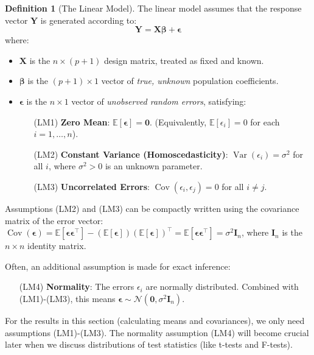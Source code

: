 \documentclass[11pt, letterpaper]{article}
\theoremstyle{definition}
\newtheorem{definition}{Definition}[section] %
\theoremstyle{plain} %
\theoremstyle{remark}
\newcommand{\E}{\mathbb{E}}            %
\newcommand{\Cov}{\operatorname{Cov}}  %
\newcommand{\Var}{\operatorname{Var}}  %
\newcommand{\vb}[1]{\bm{#1}}          %
\newcommand{\mb}[1]{\bm{#1}}          %
\newcommand{\Yvec}{\vb{Y}}            %
\newcommand{\Xmat}{\mb{X}}            %
\newcommand{\Imat}{\mb{I}}            %
\newcommand{\betavec}{\vb{\beta}}     %
\newcommand{\epsilonvec}{\vb{\epsilon}}%
\newcommand{\zerovec}{\vb{0}}        %
\begin{document}
\begin{definition}[The Linear Model] \label{def:linear_model}
The linear model assumes that the response vector $\Yvec$ is generated according to:
\begin{equation} \label{eq:linear_model_main}
\Yvec = \Xmat \betavec + \epsilonvec
\end{equation}
where:
\begin{itemize}
    \item $\Xmat$ is the $n \times (p+1)$ design matrix, treated as fixed and known.
    \item $\betavec$ is the $(p+1) \times 1$ vector of \emph{true, unknown} population coefficients.
    \item $\epsilonvec$ is the $n \times 1$ vector of \emph{unobserved random errors}, satisfying:
        \begin{enumerate}
            \item[(LM1)] \textbf{Zero Mean}: $\E[\epsilonvec] = \zerovec$. (Equivalently, $\E[\epsilon_i] = 0$ for each $i=1, \dots, n$).
            \item[(LM2)] \textbf{Constant Variance (Homoscedasticity)}: $\Var(\epsilon_i) = \sigma^2$ for all $i$, where $\sigma^2 > 0$ is an unknown parameter.
            \item[(LM3)] \textbf{Uncorrelated Errors}: $\Cov(\epsilon_i, \epsilon_j) = 0$ for all $i \neq j$.
        \end{enumerate}
\end{itemize}
Assumptions (LM2) and (LM3) can be compactly written using the covariance matrix of the error vector: $\Cov(\epsilonvec) = \E[\epsilonvec \epsilonvec^\top] - (\E[\epsilonvec])(\E[\epsilonvec])^\top = \E[\epsilonvec \epsilonvec^\top] = \sigma^2 \Imat_n$, where $\Imat_n$ is the $n \times n$ identity matrix.

Often, an additional assumption is made for exact inference:
\begin{itemize}
    \item[(LM4)] \textbf{Normality}: The errors $\epsilon_i$ are normally distributed. Combined with (LM1)-(LM3), this means $\epsilonvec \sim \mathcal{N}(\zerovec, \sigma^2 \Imat_n)$.
\end{itemize}
For the results in this section (calculating means and covariances), we only need assumptions (LM1)-(LM3). The normality assumption (LM4) will become crucial later when we discuss distributions of test statistics (like t-tests and F-tests).
\end{definition}
\end{document}
